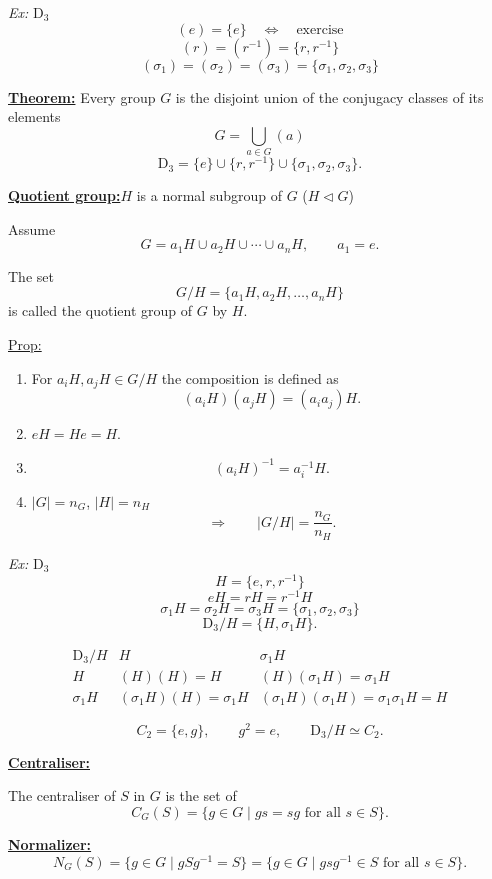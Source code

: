\documentclass[11pt,a4paper]{article}
\newcommand{\D}{\mathrm{D}}
\begin{document}
\emph{Ex:} $\D_3$
\[
(e)=\{e\}\quad\Longleftrightarrow\quad\text{exercise}
\]
\[
(r)=(r^{-1})=\{r,r^{-1}\}
\]
\[
(\sigma_1)=(\sigma_2)=(\sigma_3)=\{\sigma_1,\sigma_2,\sigma_3\}
\]

\underline{\textbf{Theorem:}} Every group $G$ is the disjoint union of the conjugacy classes of its elements
\[
G=\bigcup_{a\in G}(a)
\]
\[
\D_3=\{e\}\cup\{r,r^{-1}\}\cup\{\sigma_1,\sigma_2,\sigma_3\}.
\]

\underline{\textbf{Quotient group:}}\quad $H$ is a normal subgroup of $G$ ($H\triangleleft G$)

Assume
\[
G=a_1H\cup a_2H\cup\cdots\cup a_nH,\qquad a_1=e.
\]

The set
\[
G/H=\{a_1H,a_2H,\ldots,a_nH\}
\]
is called the quotient group of $G$ by $H$.

\underline{Prop:}
\begin{enumerate}
\item For $a_iH,a_jH\in G/H$ the composition is defined as
\[
(a_iH)(a_jH)=(a_ia_j)H.
\]

\item $eH=He=H$.

\item
\[
(a_iH)^{-1}=a_i^{-1}H.
\]

\item $|G|=n_G$, $|H|=n_H$
\[
\Longrightarrow\qquad |G/H|=\frac{n_G}{n_H}.
\]
\end{enumerate}

\emph{Ex:} $\D_3$
\[
H=\{e,r,r^{-1}\}
\]
\[
eH=rH=r^{-1}H
\]
\[
\sigma_1H=\sigma_2H=\sigma_3H=\{\sigma_1,\sigma_2,\sigma_3\}
\]
\[
\D_3/H=\{H,\sigma_1H\}.
\]

\[
\begin{array}{c|cc}
\D_3/H & H & \sigma_1H\\ \hline
H & (H)(H)=H & (H)(\sigma_1H)=\sigma_1H\\[2pt]
\sigma_1H & (\sigma_1H)(H)=\sigma_1H &
(\sigma_1H)(\sigma_1H)=\sigma_1\sigma_1H=H
\end{array}
\]

\[
C_2=\{e,g\},\qquad g^2=e,
\qquad \D_3/H\simeq C_2.
\]

\underline{\textbf{Centraliser:}}

The centraliser of $S$ in $G$ is the set of
\[
C_G(S)=\{g\in G\mid gs=sg\text{ for all }s\in S\}.
\]

\underline{\textbf{Normalizer:}}
\[
N_G(S)=\{g\in G\mid gSg^{-1}=S\}
=\{g\in G\mid gsg^{-1}\in S\text{ for all }s\in S\}.
\]
\end{document}
